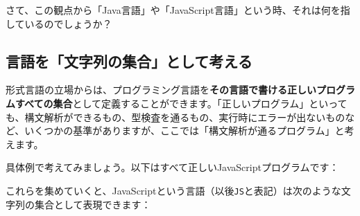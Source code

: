 さて、この観点から「Java言語」や「JavaScript言語」という時、それは何を指しているのでしょうか？

\hypertarget{chapter4-ux8a00ux8a9eux3092ux6587ux5b57ux5217ux306eux96c6ux5408ux3068ux3057ux3066ux8003ux3048ux308b}{%
\subsection{言語を「文字列の集合」として考える}\label{chapter4-ux8a00ux8a9eux3092ux6587ux5b57ux5217ux306eux96c6ux5408ux3068ux3057ux3066ux8003ux3048ux308b}}

形式言語の立場からは、プログラミング言語を\textbf{その言語で書ける正しいプログラムすべての集合}として定義することができます。「正しいプログラム」といっても、構文解析ができるもの、型検査を通るもの、実行時にエラーが出ないものなど、いくつかの基準がありますが、ここでは「構文解析が通るプログラム」と考えます。

具体例で考えてみましょう。以下はすべて正しいJavaScriptプログラムです：

\begin{Shaded}
\begin{Highlighting}[]
\NormalTok{(}\NormalTok{)}\OperatorTok{;}
\end{Highlighting}
\end{Shaded}

\begin{Shaded}
\begin{Highlighting}[]
\NormalTok{(}\NormalTok{)}\OperatorTok{;}
\end{Highlighting}
\end{Shaded}

\begin{Shaded}
\begin{Highlighting}[]
\NormalTok{(} \OperatorTok{+} \NormalTok{)}\OperatorTok{;}
\end{Highlighting}
\end{Shaded}

これらを集めていくと、JavaScriptという言語（以後\texttt{JS}と表記）は次のような文字列の集合として表現できます：

\begin{Shaded}
\begin{Highlighting}[]
\NormalTok{\}}
\end{Highlighting}
\end{Shaded}

